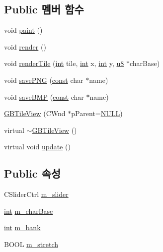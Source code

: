 \subsection*{Public 멤버 함수}
\begin{DoxyCompactItemize}
\item 
void \mbox{\hyperlink{class_g_b_tile_view_aa78a471956e777509644a0a04bab2c4d}{paint}} ()
\item 
void \mbox{\hyperlink{class_g_b_tile_view_a1012b77fed7304d7b27b9d619472e6a7}{render}} ()
\item 
void \mbox{\hyperlink{class_g_b_tile_view_ade04081b3b047c110f6ae5673c7154ee}{render\+Tile}} (\mbox{\hyperlink{_util_8cpp_a0ef32aa8672df19503a49fab2d0c8071}{int}} tile, \mbox{\hyperlink{_util_8cpp_a0ef32aa8672df19503a49fab2d0c8071}{int}} x, \mbox{\hyperlink{_util_8cpp_a0ef32aa8672df19503a49fab2d0c8071}{int}} y, \mbox{\hyperlink{_system_8h_aed742c436da53c1080638ce6ef7d13de}{u8}} $\ast$char\+Base)
\item 
void \mbox{\hyperlink{class_g_b_tile_view_a7d48513402a49269828c3111bc153d46}{save\+P\+NG}} (\mbox{\hyperlink{getopt1_8c_a2c212835823e3c54a8ab6d95c652660e}{const}} char $\ast$name)
\item 
void \mbox{\hyperlink{class_g_b_tile_view_ac61ccd982b57db14794e1f9febc67c16}{save\+B\+MP}} (\mbox{\hyperlink{getopt1_8c_a2c212835823e3c54a8ab6d95c652660e}{const}} char $\ast$name)
\item 
\mbox{\hyperlink{class_g_b_tile_view_a16e732a5dfc802bca970d5cf667386df}{G\+B\+Tile\+View}} (C\+Wnd $\ast$p\+Parent=\mbox{\hyperlink{_system_8h_a070d2ce7b6bb7e5c05602aa8c308d0c4}{N\+U\+LL}})
\item 
virtual \mbox{\hyperlink{class_g_b_tile_view_a9ae36f3d54d161d2b98723e377569634}{$\sim$\+G\+B\+Tile\+View}} ()
\item 
virtual void \mbox{\hyperlink{class_g_b_tile_view_a0b36c27b43fea0e457a26860b2476b9d}{update}} ()
\end{DoxyCompactItemize}
\subsection*{Public 속성}
\begin{DoxyCompactItemize}
\item 
C\+Slider\+Ctrl \mbox{\hyperlink{class_g_b_tile_view_ace72ce81e68876fe62cb85b09405e296}{m\+\_\+slider}}
\item 
\mbox{\hyperlink{_util_8cpp_a0ef32aa8672df19503a49fab2d0c8071}{int}} \mbox{\hyperlink{class_g_b_tile_view_a0ad19c822952ef98ced0a46d051cb87e}{m\+\_\+char\+Base}}
\item 
\mbox{\hyperlink{_util_8cpp_a0ef32aa8672df19503a49fab2d0c8071}{int}} \mbox{\hyperlink{class_g_b_tile_view_a765264072397d9630d2f3ae8e58c414e}{m\+\_\+bank}}
\item 
B\+O\+OL \mbox{\hyperlink{class_g_b_tile_view_afaaee0263ecf447f8c628d0bbf1ff76f}{m\+\_\+stretch}}
\end{DoxyCompactItemize}
